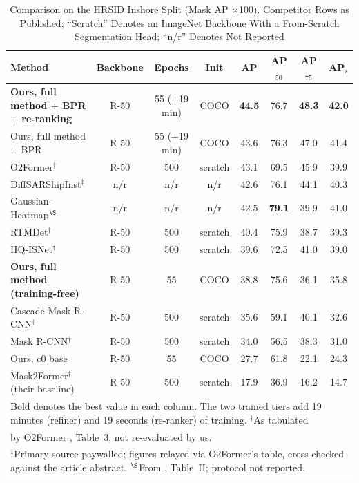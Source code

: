 \begin{table}[!t]
\caption{Comparison on the HRSID Inshore Split (Mask AP $\times$100). Competitor Rows as Published; ``Scratch'' Denotes an ImageNet Backbone With a From-Scratch Segmentation Head; ``n/r'' Denotes Not Reported}
\label{tab:sota_in}
\centering
\begin{tabular}{lccccccc}
\toprule
Method & Backbone & Epochs & Init & AP & AP$_{50}$ & AP$_{75}$ & AP$_s$ \\
\midrule
\textbf{Ours, full method $+$ BPR $+$ re-ranking} & R-50 & 55 ($+$19 min) & COCO & \textbf{44.5} & 76.7 & \textbf{48.3} & \textbf{42.0} \\
Ours, full method $+$ BPR & R-50 & 55 ($+$19 min) & COCO & 43.6 & 76.3 & 47.0 & 41.4 \\
O2Former$^{\dagger}$ \cite{o2former2025} & R-50 & 500 & scratch & 43.1 & 69.5 & 45.9 & 39.9 \\
DiffSARShipInst$^{\ddagger}$ \cite{diffsar2025} & n/r & n/r & n/r & 42.6 & 76.1 & 44.1 & 40.3 \\
Gaussian-Heatmap$^{\S}$ \cite{gaussheatmap2024} & n/r & n/r & n/r & 42.5 & \textbf{79.1} & 39.9 & 41.0 \\
RTMDet$^{\dagger}$ & R-50 & 500 & scratch & 40.4 & 75.9 & 38.7 & 39.3 \\
HQ-ISNet$^{\dagger}$ & R-50 & 500 & scratch & 39.6 & 72.5 & 41.0 & 39.0 \\
\textbf{Ours, full method (training-free)} & R-50 & 55 & COCO & 38.8 & 75.6 & 36.1 & 35.8 \\
Cascade Mask R-CNN$^{\dagger}$ & R-50 & 500 & scratch & 35.6 & 59.1 & 40.1 & 32.6 \\
Mask R-CNN$^{\dagger}$ & R-50 & 500 & scratch & 34.0 & 56.5 & 38.3 & 31.0 \\
Ours, c0 base & R-50 & 55 & COCO & 27.7 & 61.8 & 22.1 & 24.3 \\
Mask2Former$^{\dagger}$ (their baseline) & R-50 & 500 & scratch & 17.9 & 36.9 & 16.2 & 14.7 \\
\bottomrule
\multicolumn{8}{l}{\footnotesize Bold denotes the best value in each column. The two trained tiers add 19 minutes (refiner) and 19 seconds (re-ranker) of training. $^{\dagger}$As tabulated} \\
\multicolumn{8}{l}{\footnotesize by O2Former \cite{o2former2025}, Table~3; not re-evaluated by us.} \\
\multicolumn{8}{l}{\footnotesize $^{\ddagger}$Primary source paywalled; figures relayed via O2Former's table, cross-checked against the article abstract. $^{\S}$From \cite{gaussheatmap2024}, Table~II; protocol not reported.}
\end{tabular}
\end{table}

